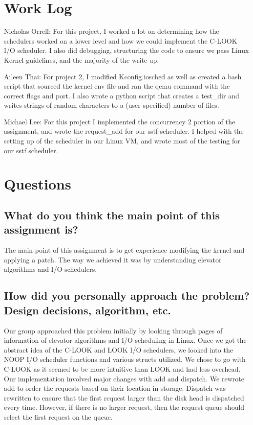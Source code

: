 \documentclass[draftclsnofoot, onecolumn]{IEEEtran}
\begin{document}
\section{Work Log}
Nicholas Orrell: For this project, I worked a lot on determining how the schedulers worked on a lower level and how we could implement the C-LOOK I/O scheduler. I also did debugging, structuring the code to ensure we pass Linux Kernel guidelines, and the majority of the write up.

Aileen Thai: For project 2, I modified Kconfig.iosched as well as created a bash script that sourced the kernel env file and ran the qemu command with the correct flags and port. I also wrote a python script that creates a test\_dir and writes strings of random characters to a (user-specified) number of files.  

Michael Lee: For this project I implemented the concurrency 2 portion of the assignment, and wrote the request\_add for our sstf-scheduler. I helped with the setting up of the scheduler in our Linux VM, and wrote most of the testing for our sstf scheduler.

\section{Questions}

\subsection{What do you think the main point of this assignment is?}
The main point of this assignment is to get experience modifying the kernel and applying a patch. The way we achieved it was by understanding elevator algorithms and I/O schedulers.

\subsection{How did you personally approach the problem? Design decisions, algorithm, etc.}
Our group approached this problem initially by looking through pages of information of elevator algorithms and I/O scheduling in Linux. Once we got the abstract idea of the C-LOOK and LOOK I/O schedulers, we looked into the NOOP I/O scheduler functions and various structs utilized. We chose to go with C-LOOK as it seemed to be more intuitive than LOOK and had less overhead. Our implementation involved major changes with add and dispatch. We rewrote add to order the requests based on their location in storage. Dispatch was rewritten to ensure that the first request larger than the disk head is dispatched every time. However, if there is no larger request, then the request queue should select the first request on the queue.
\end{document}
